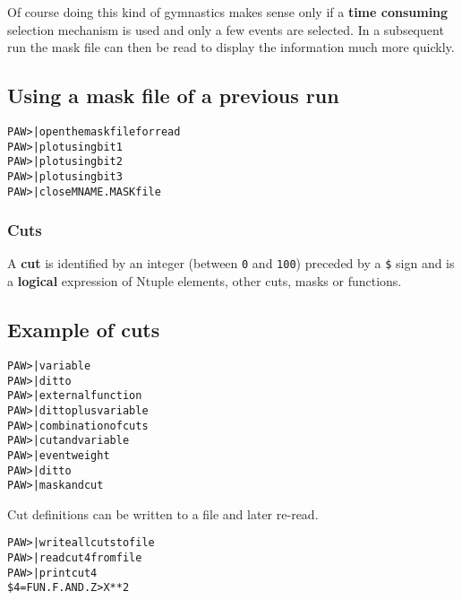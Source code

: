Of course doing this kind of gymnastics makes sense only if a {\bf time 
consuming} selection mechanism is used and only a few events are selected. In a 
subsequent run the mask file can then be read to display the information much 
more quickly.

\subsection*{Using a mask file of a previous run}
\begin{alltt}
 PAW >                    | open the mask file for read
 PAW >              | plot using bit 1
 PAW >              | plot using bit 2
 PAW >              | plot using bit 3
 PAW >                   | close MNAME.MASK file
\end{alltt}

\subsubsection{Cuts}

A {\bf cut} is identified by an integer (between \texttt{0} and \texttt{100})
preceded by a \texttt{\$} sign and is a {\bf logical} expression of Ntuple 
elements, other cuts, masks or functions. 

\subsection*{Example of cuts}
\begin{alltt}
 PAW >                       | variable  \PAWcind[NTCUT]{}
 PAW >   | ditto
 PAW >                     | external function
 PAW >          | ditto plus variable
 PAW >      | combination of cuts
 PAW >               | cut and variable
 PAW >                         | event weight
 PAW >                   | ditto
 PAW >          | mask and cut
\end{alltt}
\par Cut definitions can be written to a file and later re-read.
\begin{alltt}
 PAW >                | write all cuts to file
 PAW >                | read cut 4 from file
 PAW >                         | print cut 4
 \$4  =  FUN.F.AND.Z>X**2
\end{alltt}

